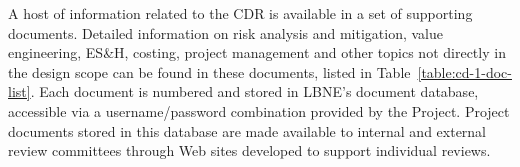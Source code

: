 A host of information related to the CDR is available in a set of supporting documents. Detailed information on risk analysis and mitigation, value engineering, ES\&H, costing, project management and other topics not directly in the design scope can be found in these documents, listed in 
Table~\ref{table:cd-1-doc-list}. Each document is numbered and stored in LBNE's document database, accessible via a username/password combination provided by the Project. Project documents stored in this database are made available to internal and external review committees through Web sites developed to support individual reviews.


